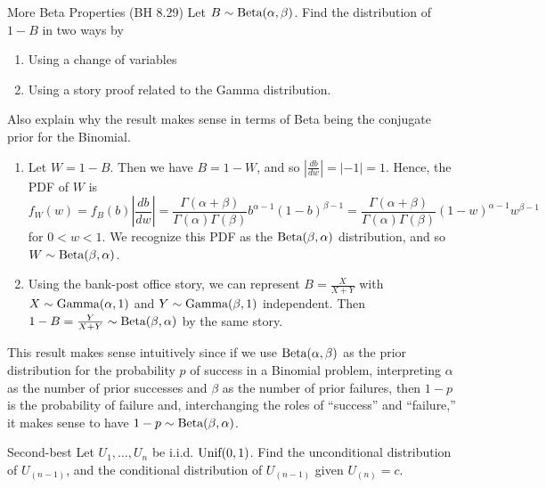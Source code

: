 \documentclass[11.5pt]{article}
\begin{document}

\begin{exercise}{More Beta Properties (BH 8.29)}
Let $B\sim \textrm{Beta}(\alpha, \beta)$. Find the distribution of $1 - B$ in two ways by
\begin{enumerate}
\item Using a change of variables  
\item Using a story proof related to the Gamma distribution. 
\end{enumerate}
Also explain why the result makes sense in terms
of Beta being the conjugate prior for the Binomial.
\end{exercise}

\begin{solution}{4}
\vspace{-0.5mm}
\begin{enumerate}
\item Let $W = 1 - B$. Then we have $B = 1 - W$, and so $\left| \frac{db}{dw} \right| = |-1| = 1$. Hence, the PDF of $W$ is
$$f_W(w) = f_B(b) \left| \frac{db}{dw} \right| = \frac{\Gamma(\alpha + \beta)}{\Gamma(\alpha)\Gamma(\beta)}b^{\alpha - 1}(1 - b)^{\beta - 1} = \frac{\Gamma(\alpha + \beta)}{\Gamma(\alpha)\Gamma(\beta)}(1 - w)^{\alpha - 1}w^{\beta - 1}$$
for $0 < w < 1$. We recognize this PDF as the $\textrm{Beta}(\beta, \alpha)$ distribution, and so $W \sim \textrm{Beta}(\beta, \alpha)$.
\item Using the bank-post office story, we can represent $B = \frac{X}{X + Y}$ with $X \sim \textrm{Gamma}(\alpha, 1)$ and $Y \sim \textrm{Gamma}(\beta, 1)$ independent. Then $1 - B = \frac{Y}{X + Y} \sim \textrm{Beta}(\beta, \alpha)$ by the same story.
\end{enumerate}
This result makes sense intuitively since if we use $\textrm{Beta}(\alpha, \beta)$ as the prior distribution for the probability $p$ of success in a Binomial problem, interpreting $\alpha$ as the number of prior successes and $\beta$ as the number of prior failures, then $1 - p$ is the probability of failure and, interchanging the roles of ``success'' and ``failure,'' it makes sense to have $1 - p \sim \textrm{Beta}(\beta, \alpha)$.
\end{solution}


\begin{exercise}{Second-best}
Let $U_1, \ldots, U_n$ be i.i.d. $\textrm{Unif}(0, 1)$. Find the unconditional distribution of $U_{(n - 1)}$, and the conditional distribution of $U_{(n - 1)}$ given $U_{(n)} = c$.
\end{exercise}
\end{document}

